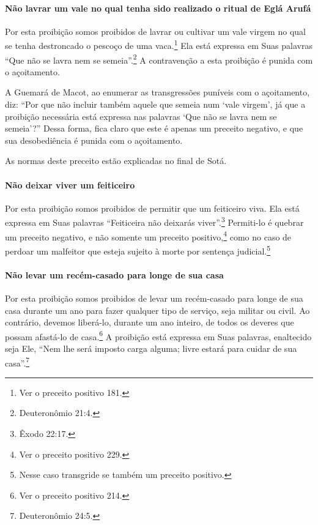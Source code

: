 \paragraph{Não lavrar um vale no qual tenha sido realizado o ritual de Eglá Arufá}

Por esta proibição somos proibidos de lavrar ou cultivar um vale virgem
no qual se tenha destroncado o pescoço de uma
vaca.\footnote{Ver o preceito positivo 181.} Ela está expressa em Suas palavras ``Que
não se lavra nem se semeia''.\footnote{Deuteronômio 21:4.} A contravenção a esta
proibição é punida com o açoitamento.

A Guemará de Macot, ao enumerar as transgressões puníveis com o
açoitamento, diz: ``Por que não incluir também aquele que semeia num
`vale virgem', já que a proibição necessária está expressa nas palavras
`Que não se lavra nem se semeia'?'' Dessa forma, fica claro que este é
apenas um preceito negativo, e que sua desobediência é punida com o
açoitamento.

As normas deste preceito estão explicadas no final de Sotá.

\paragraph{Não deixar viver um feiticeiro}

Por esta proibição somos proibidos de permitir que um feiticeiro viva.
Ela está expressa em Suas palavras ``Feiticeira não deixarás viver''.\footnote{Êxodo 22:17.} Permiti-lo é quebrar um preceito negativo, e não somente um
preceito positivo,\footnote{Ver o preceito positivo 229.} como no caso de perdoar um
malfeitor que esteja sujeito à morte por sentença
judicial.\footnote{Nesse caso transgride se também um preceito positivo.}

\paragraph{Não levar um recém-casado para longe de sua casa}

Por esta proibição somos proibidos de levar um recém-casado para longe
de sua casa durante um ano para fazer qualquer tipo de serviço, seja
militar ou civil. Ao contrário, devemos liberá-lo, durante um ano
inteiro, de todos os deveres que possam afastá-lo de
casa.\footnote{Ver o preceito positivo 214.} A proibição está expressa em Suas palavras,
enaltecido seja Ele, ``Nem lhe será imposto carga alguma; livre estará
para cuidar de sua casa''.\footnote{Deuteronômio 24:5.}

